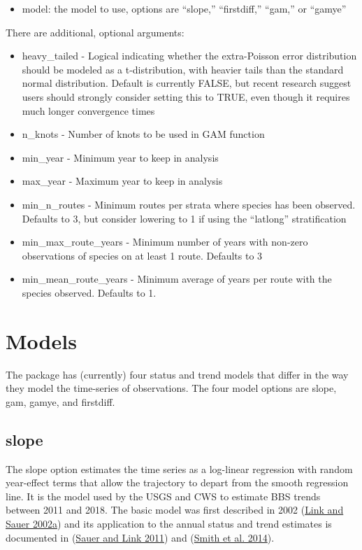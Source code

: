 \documentclass[
]{book}
\providecommand{\tightlist}{%
  \setlength{\itemsep}{0pt}\setlength{\parskip}{0pt}}
\begin{document}
\begin{itemize}
\tightlist
\item
  model: the model to use, options are ``slope,'' ``firstdiff,'' ``gam,'' or ``gamye''
\end{itemize}

There are additional, optional arguments:

\begin{itemize}
\item
  heavy\_tailed - Logical indicating whether the extra-Poisson error distribution should be modeled as a t-distribution, with heavier tails than the standard normal distribution. Default is currently FALSE, but recent research suggest users should strongly consider setting this to TRUE, even though it requires much longer convergence times
\item
  n\_knots - Number of knots to be used in GAM function
\item
  min\_year - Minimum year to keep in analysis
\item
  max\_year - Maximum year to keep in analysis
\item
  min\_n\_routes - Minimum routes per strata where species has been observed. Defaults to 3, but consider lowering to 1 if using the ``latlong'' stratification
\item
  min\_max\_route\_years - Minimum number of years with non-zero observations of species on at least 1 route. Defaults to 3
\item
  min\_mean\_route\_years - Minimum average of years per route with the species observed. Defaults to 1.
\end{itemize}

\hypertarget{Model_list}{%
\section{Models}\label{Model_list}}

The package has (currently) four status and trend models that differ in the way they model the time-series of observations. The four model options are slope, gam, gamye, and firstdiff.

\hypertarget{slope}{%
\subsection{slope}\label{slope}}

The slope option estimates the time series as a log-linear regression with random year-effect terms that allow the trajectory to depart from the smooth regression line. It is the model used by the USGS and CWS to estimate BBS trends between 2011 and 2018. The basic model was first described in 2002 (\protect\hyperlink{ref-link2002}{Link and Sauer 2002a}) and its application to the annual status and trend estimates is documented in (\protect\hyperlink{ref-sauer2011}{Sauer and Link 2011}) and (\protect\hyperlink{ref-smith2014}{Smith et al. 2014}).
\end{document}
